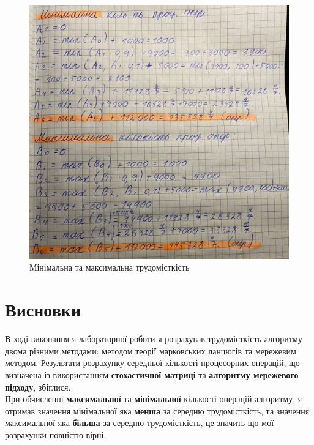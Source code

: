 \begin{figure}[h!]
    \centering
    \includegraphics[width=14cm]{reports/algos/lab1/assets/12.jpg}
    \caption{Мінімальна та максимальна трудомісткість}
\end{figure}

\section{Висновки}
В ході виконання я лабораторної роботи я розрахував трудомісткість алгоритму двома різними методами: методом теорії марковських ланцюгів та мережевим методом. Результати розрахунку середньої кількості процесорних операцій, що визначена із використанням \textbf{стохастичної матриці} та \textbf{алгоритму мережевого підходу}, збіглися. \\

    При обчисленні \textbf{максимальної} та \textbf{мінімальної} кількості операцій алгоритму, я отримав значення мінімальної яка \textbf{менша} за середню трудомісткість, та значення максимальної яка \textbf{більша} за середню трудомісткість, це значить що мої розрахунки повністю вірні.